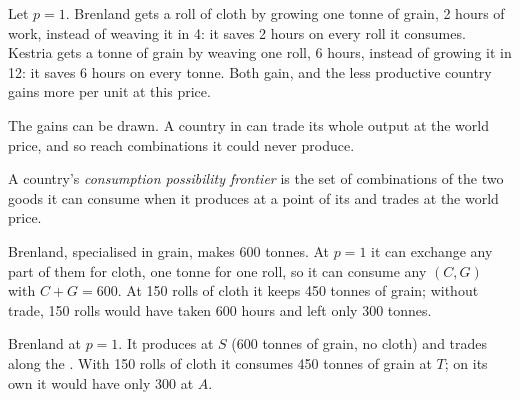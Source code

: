 \begin{example}\label{ex:g10:ricardo-model:gains}
Let $p = 1$. Brenland gets a roll of cloth by growing one tonne of grain, 2 hours of work, instead of
weaving it in 4: it saves 2 hours on every roll it consumes. Kestria gets a tonne of grain by weaving one
roll, 6 hours, instead of growing it in 12: it saves 6 hours on every tonne. Both gain, and the less
productive country gains more per unit at this price.
\end{example}

The gains can be drawn. A country in  can trade its whole output at the world
price, and so reach combinations it could never produce.

\begin{definition}\label{def:g10:ricardo-model:cpf}
A country's \emph{consumption possibility frontier} is the set of
combinations of the two goods it can consume when it produces at a point of its  and trades at the world price.
\end{definition}

Brenland, specialised in grain, makes 600 tonnes. At $p = 1$ it can exchange any part of them for cloth,
one tonne for one roll, so it can consume any $(C, G)$ with $C + G = 600$. At 150 rolls of cloth it keeps
450 tonnes of grain; without trade, 150 rolls would have taken 600 hours and left only 300 tonnes.

\begin{omfigure}

{\small Brenland at $p = 1$. It produces at $S$ (600 tonnes of grain, no cloth) and trades along the
. With 150 rolls of cloth it consumes 450 tonnes of grain at $T$; on its
own it would have only 300 at $A$.}
\end{omfigure}

